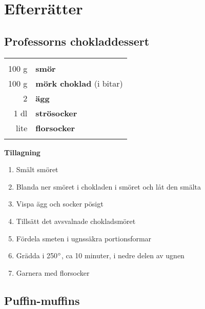 
\section{Efterrätter}

\clearpage

\subsection{Professorns chokladdessert}

\begin{table}[H]
	\begin{tabular}{rl}
	\hline
	&\\
		100 g & \textbf{smör}\\
		100 g & \textbf{mörk choklad} (i bitar)\\
		2 & \textbf{ägg}\\
		1 dl & \textbf{strösocker}\\
		lite & \textbf{florsocker}\\
	&\\
	\hline
	\end{tabular}
\end{table}


\begin{multicols*}{2}

\noindent \textbf{Tillagning}
\begin{enumerate}
	\itemsep0cm
	\item Smält smöret
	\item Blanda ner smöret i chokladen i smöret och låt den smälta
	\item Vispa ägg och socker pösigt
	\item Tillsätt det avsvalnade chokladsmöret
	\item Fördela smeten i ugnssäkra portions\-formar
	\item Grädda i 250$\degree$, ca 10 minuter, i nedre delen av ugnen
	\item Garnera med florsocker
\end{enumerate}

\end{multicols*}

\clearpage

\subsection{Puffin-muffins }

